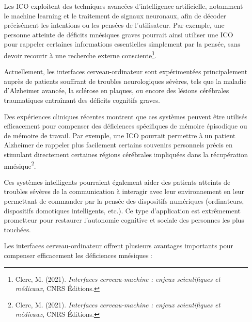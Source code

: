 \documentclass[12pt,a4paper]{report}
\begin{document}
Les ICO exploitent des techniques avancées d’intelligence artificielle, notamment le machine learning et le traitement de signaux neuronaux, afin de décoder précisément les intentions ou les pensées de l’utilisateur. Par exemple, une personne atteinte de déficits mnésiques graves pourrait ainsi utiliser une ICO pour rappeler certaines informations essentielles simplement par la pensée, sans devoir recourir à une recherche externe consciente\footnote{Clerc, M. (2021). \textit{Interfaces cerveau-machine : enjeux scientifiques et médicaux}, CNRS Éditions.}.

Actuellement, les interfaces cerveau-ordinateur sont expérimentées principalement auprès de patients souffrant de troubles neurologiques sévères, tels que la maladie d’Alzheimer avancée, la sclérose en plaques, ou encore des lésions cérébrales traumatiques entraînant des déficits cognitifs graves.

Des expériences cliniques récentes montrent que ces systèmes peuvent être utilisés efficacement pour compenser des déficiences spécifiques de mémoire épisodique ou de mémoire de travail. Par exemple, une ICO pourrait permettre à un patient Alzheimer de rappeler plus facilement certains souvenirs personnels précis en stimulant directement certaines régions cérébrales impliquées dans la récupération mnésique\footnote{Clerc, M. (2021). \textit{Interfaces cerveau-machine : enjeux scientifiques et médicaux}, CNRS Éditions.}.

Ces systèmes intelligents pourraient également aider des patients atteints de troubles sévères de la communication à interagir avec leur environnement en leur permettant de commander par la pensée des dispositifs numériques (ordinateurs, dispositifs domotiques intelligents, etc.). Ce type d’application est extrêmement prometteur pour restaurer l’autonomie cognitive et sociale des personnes les plus touchées.

Les interfaces cerveau-ordinateur offrent plusieurs avantages importants pour compenser efficacement les déficiences mnésiques :
\end{document}
